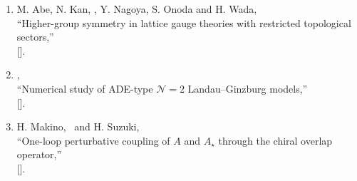 \begin{enumerate}
       ``Lattice construction of mixed 't Hooft anomaly with higher-form symmetry,''\\
       [].
 \item M. Abe, N. Kan, \OM, Y. Nagoya, S. Onoda and H. Wada,\\
       ``Higher-group symmetry in lattice gauge theories with restricted topological sectors,''\\
       [].
 \item \OM,\\
       ``Numerical study of ADE-type $\mathcal{N}=2$ Landau--Ginzburg models,''\\
       [].
 \item H. Makino, \OM\ and H. Suzuki,\\
       ``One-loop perturbative coupling of $A$ and $A_\star$ through the chiral overlap operator,''\\
       [].
\end{enumerate}

